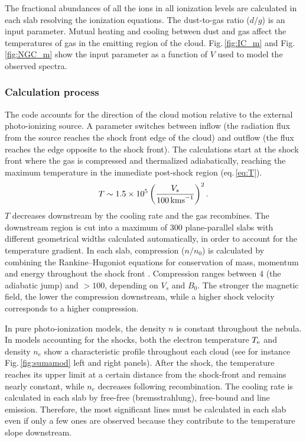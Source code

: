 \documentclass[../main.tex]{subfiles}
\begin{document}
The fractional abundances  of all the ions in all ionization levels are calculated  in each slab resolving the ionization equations.
The dust-to-gas ratio ($d/g$)  is an input parameter. 
Mutual heating and cooling between dust and gas affect the temperatures of gas in the emitting region of the cloud.
Fig.\,\ref{fig:IC_m} and Fig.\,\ref{fig:NGC_m} show the input parameter as a function of $V$ used to model the observed spectra.

\subsubsection{Calculation process}

The code accounts for the direction of the cloud motion relative to the external photo-ionizing source.  
A parameter switches between inflow (the radiation flux from the source reaches the shock front edge of the cloud) and outflow (the flux reaches the edge opposite to the shock front).
The calculations start at the shock front where the gas is compressed and thermalized adiabatically, reaching the maximum temperature in the immediate post-shock region (eq.\,\ref{eq:T}).
\begin{equation}
\label{eq:T}
T\sim 1.5 \times 10^5 \left(\frac{V_s}{100\,\si{\kms}}\right)^2. 
\end{equation}
$T$ decreases downstream by the cooling rate and the gas recombines. 
The downstream region is cut into a maximum of 300 plane-parallel slabs with different geometrical widths calculated automatically, in order to account for the temperature gradient.
In each slab, compression ($n/n_0$) is calculated by combining the Rankine--Hugoniot equations for conservation of mass, momentum and energy throughout the shock front \citep{Cox72}.
Compression ranges between $4$ (the adiabatic jump) and $> 100$, depending on $V_s$ and $B_0$. 
The stronger the magnetic field, the lower the compression downstream, while a higher shock velocity corresponds to a higher compression.

In pure photo-ionization models, the density $n$ is constant throughout the nebula.
In models accounting for the shocks, both the electron temperature  $T_{\rm e}$  and  density $n_e$ show a characteristic profile throughout each cloud (see for instance Fig.\,\ref{fig:sumamod} left and right panels). 
After the shock, the temperature reaches its upper limit at a certain distance from the shock-front and remains nearly constant, while $n_e$ decreases following recombination.
The cooling rate is calculated in each slab by free-free (bremsstrahlung), free-bound and line emission. 
Therefore, the most significant lines must be calculated in each slab even if only a few ones are observed because they contribute to the temperature slope downstream.
\end{document}

